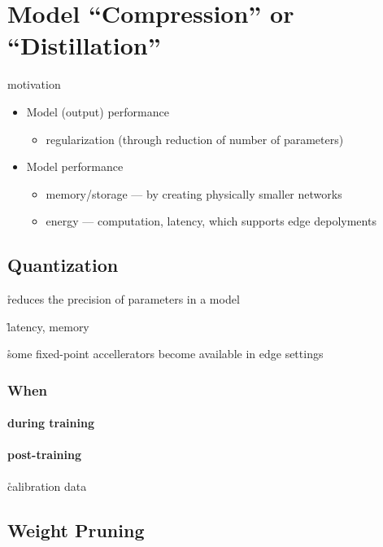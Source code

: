 \chapter{Model ``Compression'' or ``Distillation''}
motivation


\begin{itemize}[noitemsep,topsep=0pt]
	\item Model (output) performance
	\begin{itemize}[noitemsep,topsep=0pt]
		\item regularization (through reduction of number of parameters)
	\end{itemize}
	\item Model performance
	\begin{itemize}[noitemsep,topsep=0pt]
		\item memory/storage --- by creating physically smaller networks
		\item energy --- computation, latency, which supports edge depolyments
	\end{itemize}
\end{itemize}

\section{Quantization}


\r{reduces the precision of parameters in a model}

\r{latency, memory}

\r{some fixed-point accellerators become available in edge settings}

\subsection{When}

\subsubsection{during training}

\subsubsection{post-training}

\r{calibration data}

\section{Weight Pruning}

